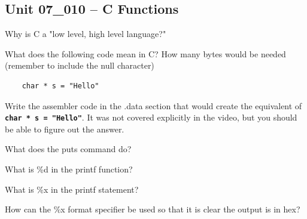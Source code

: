 \documentclass[letterpaper,12pt]{exam}
\newcommand{\unit}{Unit 07}
\begin{document}

\par{\selectfont\textbf{}}
\begin{questions}

\section*{\unit\_010 -- C Functions }
\begin{samepage}
    \question Why is C a "low level, high level language?"
    \vspace{5mm}
\end{samepage}
\par
\begin{samepage}
    \question What does the following code mean in C?  How many bytes would be needed (remember to include the null character)
\begin{verbatim}
    char * s = "Hello"
\end{verbatim}
    \vspace{5mm}
\end{samepage}
\par
 \begin{samepage}
     \question  Write the assembler code in the .data section that would create the equivalent of \texttt{\textbf{char * s = "Hello"}}. It was not covered explicitly in the video, but you should be able to figure out the answer.
     \vspace{15mm}
 \end{samepage}
 \par
\begin{samepage}
    \question What does the puts command do?
    \vspace{5mm}
\end{samepage}
\par
 \begin{samepage}
     \question What is \%d in the printf function?
     \vspace{5mm}
 \end{samepage}
 \par
  \begin{samepage}
      \question What is \%x in the printf statement?
      \vspace{5mm}
  \end{samepage}
  \par
   \begin{samepage}
       \question How can the \%x format specifier be used so that it is clear the output is in hex?
       \vspace{5mm}
   \end{samepage}
   \par
    

\end{questions}
\end{document}
